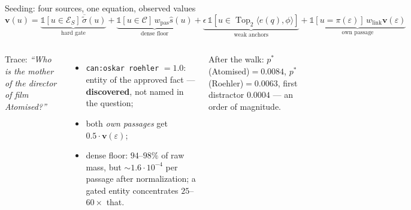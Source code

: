 \documentclass[aspectratio=169,10pt]{beamer}
\newcommand{\good}[1]{\textcolor{verde}{\textbf{#1}}}
\DeclareMathOperator*{\Top}{Top}
\begin{document}
\begin{frame}{Seeding: four sources, one equation, observed values}
\vspace{-1mm}
\[
\mathbf v(u)=
\underbrace{\mathbb 1[u\in\mathcal E_S]\,\overline{\tilde\sigma}(u)}_{\text{hard gate}}
+\underbrace{\mathbb 1[u\in\mathcal C]\, w_{\text{pas}}\hat s(u)}_{\text{dense floor}}
+\underbrace{\epsilon\,\mathbb 1[u\in\Top_2\langle e(q),\phi\rangle]}_{\text{weak anchors}}
+\underbrace{\mathbb 1[u{=}\pi(\varepsilon)]\, w_{\text{link}}\mathbf v(\varepsilon)}_{\text{own passage}}
\]
\begin{columns}[T]
\centering
{}
\footnotesize
Trace: \emph{``Who is the mother of the director of film Atomised?''}
\begin{itemize}\footnotesize
\item \texttt{can:oskar roehler} $=1.0$: entity of the approved fact ---
  \good{discovered}, not named in the question;
\item both \emph{own passages} get $0.5\cdot\mathbf v(\varepsilon)$;
\item dense floor: $94$--$98\%$ of raw mass, but ${\sim}1.6{\cdot}10^{-4}$
  per passage after normalization; a gated entity concentrates
  $25$--$60\times$ that.
\end{itemize}
After the walk: $p^{*}$(Atomised)$=0.0084$, $p^{*}$(Roehler)$=0.0063$,
first distractor $0.0004$ --- an order of magnitude.
\end{columns}
\end{frame}
\end{document}
